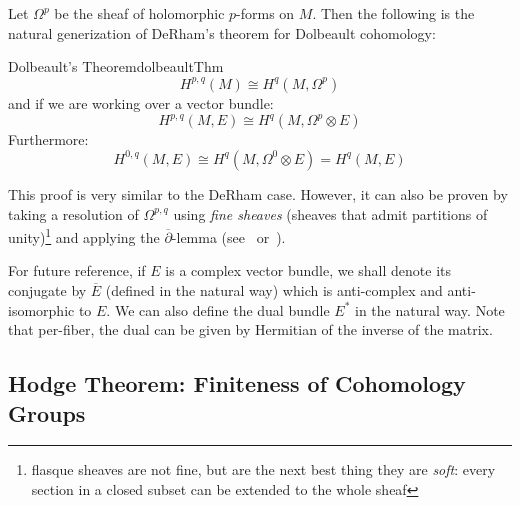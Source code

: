 \documentclass{book}
\begin{document}
Let $\Omega^p$ be the sheaf of holomorphic $p$-forms on $M$. Then the following is the natural
generization of DeRham's theorem for Dolbeault cohomology:
\begin{thm}{Dolbeault's Theorem}{dolbeaultThm}
  \[
  H^{p,q}(M) \cong H^q(M, \Omega^p)
\]
and if we are working over a vector bundle:
\[
  H^{p,q}(M, E) \cong H^q(M, \Omega^p\otimes E)
\]
Furthermore:
\[
  H^{0,q}(M, E) \cong H^q(M, \Omega^0\otimes E) = H^q(M, E)
\]
\end{thm}

\begin{Proof}
  This proof is very similar to the DeRham case. However, it can also be proven by taking a resolution of
  $\Omega^{p,q}$ using \emph{fine sheaves} (sheaves that admit partitions of unity)\footnote{flasque sheaves are
  not fine, but are the next best thing they are \emph{soft}: every section in a closed subset can be extended
  to the whole sheaf} and applying the $\overline{\partial}$-lemma
  (see~\cite{gallierComplexAlgebraicGeometry2011} or~\cite[section~15.4]{hirzebruchTopologicalMethodsAlgebraic1995}).
\end{Proof}

For future reference, if $E$ is a complex vector bundle, we shall denote its conjugate by $\overline{E}$
(defined in the natural way) which is anti-complex and anti-isomorphic to $E$. We can also define the dual
bundle $E^*$ in the natural way. Note that per-fiber, the dual can be given by Hermitian of the inverse of the
matrix.

\subsection*{Hodge Theorem: Finiteness of Cohomology Groups}
\end{document}
